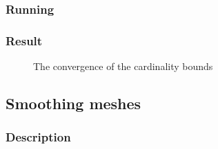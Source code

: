 \documentclass[paper=a4, fontsize=11pt]{scrartcl} %
\numberwithin{equation}{section} %
\numberwithin{figure}{section} %
\numberwithin{table}{section} %
\begin{document}
\subsubsection{Running}

\subsubsection{Result}


\begin{figure}[H]
\caption{The convergence of the cardinality bounds\label{fig:simple}}
\noindent{}
\end{figure} 


\subsection{Smoothing meshes}

\subsubsection{Description}

\end{document}
